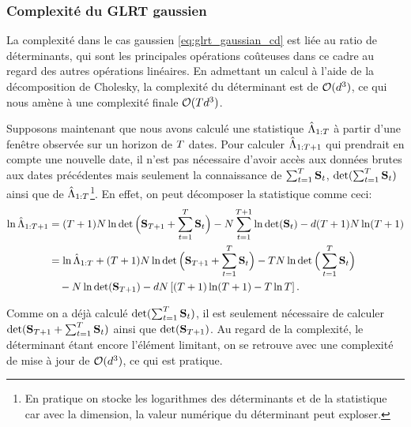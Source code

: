 \subsubsection{Complexité du GLRT gaussien}

La complexité dans le cas gaussien \eqref{eq:glrt_gaussian_cd} est liée au ratio de déterminants, qui sont les principales opérations coûteuses dans ce cadre au regard des autres opérations linéaires. En admettant un calcul à l'aide de la décomposition de Cholesky, la complexité du déterminant est de $\mathcal{O}(d^3)$, ce qui nous amène à une complexité finale $\mathcal{O}(Td^3)$.

Supposons maintenant que nous avons calculé une statistique $\hat{\Lambda}_{1:T}$ à partir d'une fenêtre observée sur un horizon de $T$ dates. Pour calculer $\hat{\Lambda}_{1:T+1}$ qui prendrait en compte une nouvelle date, il n'est pas nécessaire d'avoir accès aux données brutes aux dates précédentes mais seulement la connaissance de $\sum_{t=1}^{T}\mathbf{S}_t$, $\operatorname{\operatorname{det}}(\sum_{t=1}^{T}\mathbf{S}_t)$ ainsi que de $\hat{\Lambda}_{1:T}$\footnote{En pratique on stocke les logarithmes des déterminants et de la statistique car avec la dimension, la valeur numérique du déterminant peut exploser.}. En effet, on peut décomposer la statistique comme ceci\cite{Conradsen_2016}:
\begin{equation*}
\begin{aligned}
  \ln\hat{\Lambda}_{1:T+1}
  &= (T+1)N\ln\operatorname{\operatorname{det}}\Big(\mathbf{S}_{T+1} + \sum_{t=1}^{T} \mathbf{S}_t\Big)
     - N\sum_{t=1}^{T+1}\ln\operatorname{\operatorname{det}}(\mathbf{S}_t)
     - d(T+1)N\ln(T+1) \\
  &= \ln\hat{\Lambda}_{1:T}
     + (T+1)N\ln\operatorname{\operatorname{det}}\Big(\mathbf{S}_{T+1} + \sum_{t=1}^{T} \mathbf{S}_t\Big)
     - TN\ln\operatorname{\operatorname{det}}\Big(\sum_{t=1}^{T} \mathbf{S}_t\Big) \\
  &\quad - N\ln\operatorname{\operatorname{det}}(\mathbf{S}_{T+1})
     - dN\left[(T+1)\ln(T+1)-T\ln T\right].
\end{aligned}
\end{equation*}

Comme on a déjà calculé $\operatorname{\operatorname{det}}(\sum_{t=1}^{T}\mathbf{S}_t)$, il est seulement nécessaire de calculer $\operatorname{\operatorname{det}}(\mathbf{S}_{T+1} + \sum_{t=1}^{T} \mathbf{S}_t )$ ainsi que $\operatorname{\operatorname{det}}(\mathbf{S}_{T+1})$. Au regard de la complexité, le déterminant étant encore l'élément limitant, on se retrouve avec une complexité de mise à jour de $\mathcal{O}(d^3)$, ce qui est pratique.



